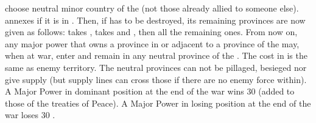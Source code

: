 \begin{digressions}
  choose neutral minor country of the \HRE (not those already allied to
  someone else).
  \aparag \paysBrandebourg annexes  if it is in
  \paysHanse.
  \aparag Then, if \paysHanse has to be destroyed, its remaining provinces are
  now given as follows: \SUE takes \provinceBremen, \paysBrandebourg takes
   and \provinceMecklenburg, then \DANmin all the
  remaining ones.
  \aparag From now on, any major power that owns a province in \HRE or
  adjacent to a province of the \HRE may, when at war, enter and remain in any
  neutral province of the \HRE. The cost in \MP is the same as enemy
  territory. The neutral provinces can not be pillaged, besieged nor give
  supply (but supply lines can cross those if there are no enemy force
  within).
  \bparag
  \bparag A Major Power in dominant position at the end of the war wins 30 \PV
  (added to those of the treaties of Peace).
  \bparag A Major Power in losing position at the end of the war loses 30 \PV.
\end{digressions}


